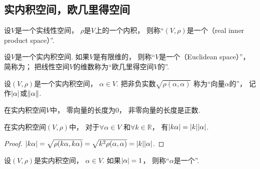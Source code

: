 \subsection{实内积空间，欧几里得空间}
\begin{definition}
设\(V\)是一个实线性空间，
\(\rho\)是\(V\)上的一个内积，
则称“\((V,\rho)\)是一个（real inner product space）”.
\end{definition}

\begin{definition}
设\(V\)是一个实内积空间.
如果\(V\)是有限维的，
则称“\(V\)是一个（Euclidean space）”，
简称为；
把线性空间\(V\)的维数称为“欧几里得空间\(V\)的”.
\end{definition}

\begin{definition}
设\((V,\rho)\)是一个实内积空间，
\(\alpha \in V\).
把非负实数\(\sqrt{\rho(\alpha,\alpha)}\)
称为“向量\(\alpha\)的”，
记作\(\abs{\alpha}\)或\(\norm{\alpha}\).
\end{definition}

\begin{property}\label{theorem:实内积空间.向量的长度具有非负性}
在实内积空间\(V\)中，
零向量的长度为\(0\)，
非零向量的长度是正数.
\end{property}

\begin{property}\label{theorem:实内积空间.向量的长度具有齐次性}
在实内积空间\((V,\rho)\)中，
对于\(\forall \alpha \in V\)
和\(\forall k \in \mathbb{R}\)，
有\(\abs{k\alpha} = \abs{k} \abs{\alpha}\).
\begin{proof}
\(\abs{k\alpha}
= \sqrt{\rho(k\alpha,k\alpha)}
= \sqrt{k^2\rho(\alpha,\alpha)}
= \abs{k} \abs{\alpha}\).
\end{proof}
\end{property}

\begin{definition}
设\((V,\rho)\)是实内积空间，
\(\alpha \in V\).
如果\(\abs{\alpha} = 1\)，
则称“\(\alpha\)是一个”.
\end{definition}

